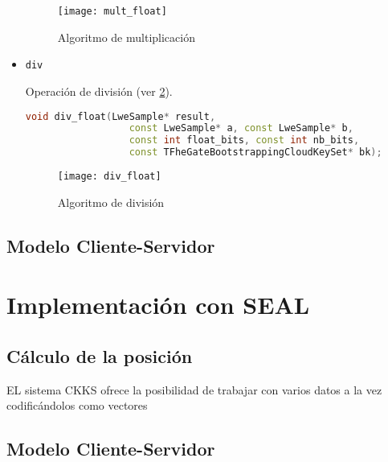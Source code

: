 \begin{itemize}
  \begin{figure}[h]
    \caption{Algoritmo de multiplicación}
    \label{fig:mult_float}
    \texttt{[image: mult\_float]}
  \end{figure}


  \item \texttt{div}

  Operación de división (ver \ref{fig:div_float}).

  \begin{lstlisting}[language=c++]
  void div_float(LweSample* result,
                  const LweSample* a, const LweSample* b,
                  const int float_bits, const int nb_bits,
                  const TFheGateBootstrappingCloudKeySet* bk);
  \end{lstlisting}

  \begin{figure}[h]
    \caption{Algoritmo de división}
    \label{fig:div_float}
    \texttt{[image: div\_float]}
  \end{figure}


\end{itemize}

\subsection{Modelo Cliente-Servidor}



\section{Implementación con SEAL}

\subsection{Cálculo de la posición}

EL sistema CKKS ofrece la posibilidad de trabajar con varios datos a la vez codificándolos como vectores

\subsection{Modelo Cliente-Servidor}
